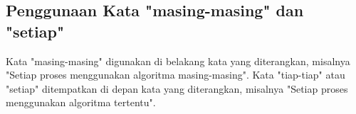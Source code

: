 \subsection{Penggunaan Kata "masing-masing" dan "setiap"}
Kata "masing-masing" digunakan di belakang kata yang diterangkan, misalnya
"Setiap proses menggunakan algoritma masing-masing". Kata "tiap-tiap" atau "setiap"
ditempatkan di depan kata yang diterangkan, misalnya
"Setiap proses menggunakan algoritma tertentu".
\fi
